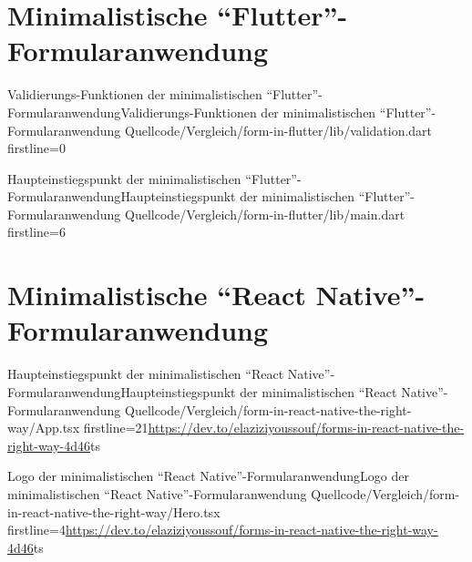 

\chapter{Minimalistische \enquote{Flutter}-Formularanwendung}
\label{chap:VergleichFlutter}

\begin{alexlisting}{Validierungs-Funktionen der minimalistischen \enquote{Flutter}-Formularanwendung}{Validierungs-Funktionen der minimalistischen \enquote{Flutter}-Formularanwendung}
  {Quellcode/Vergleich/form-in-flutter/lib/validation.dart}
  {firstline=0}
  \label{lst:VergleichFlutterValidation}
\end{alexlisting}

\renewcommand{\fcolorbox}[4][]{#4}
\begin{alexlisting}{Haupteinstiegspunkt der minimalistischen \enquote{Flutter}-Formularanwendung}{Haupteinstiegspunkt der minimalistischen \enquote{Flutter}-Formularanwendung}
  {Quellcode/Vergleich/form-in-flutter/lib/main.dart}
  {firstline=6}
  \label{lst:VergleichFlutterMain}
\end{alexlisting}

\clearpage
\chapter{Minimalistische \enquote{React Native}-Formularanwendung} 
\label{chap:VergleichReactNatveApp}

\begin{fremdeslisting}{Haupteinstiegspunkt der minimalistischen \enquote{React Native}-Formularanwendung}{Haupteinstiegspunkt der minimalistischen \enquote{React Native}-Formularanwendung}
  {Quellcode/Vergleich/form-in-react-native-the-right-way/App.tsx}
  {firstline=21}{\url{https://dev.to/elaziziyoussouf/forms-in-react-native-the-right-way-4d46}}{ts}

  \label{lst:VergleichReactNatveApp}

\end{fremdeslisting}

\begin{fremdeslisting}{Logo der minimalistischen \enquote{React Native}-Formularanwendung}{Logo der minimalistischen \enquote{React Native}-Formularanwendung}
  {Quellcode/Vergleich/form-in-react-native-the-right-way/Hero.tsx}
  {firstline=4}{\url{https://dev.to/elaziziyoussouf/forms-in-react-native-the-right-way-4d46}}{ts}

  \label{lst:VergleichReactNatveHero}

\end{fremdeslisting}

